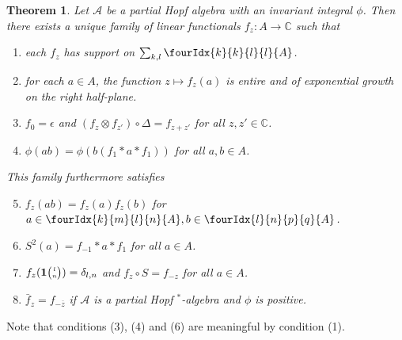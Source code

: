 \documentclass[10pt]{article}
\newcommand{\C}{\mathbb{C}}
\newcommand{\Grt}[3]{#1{\tiny {\begin{pmatrix} #2\\#3\end{pmatrix}}}}
\newcommand{\UnitC}[2]{\Grt{\mathbf{1}}{#1}{#2}}
\newcommand{\Gr}[5]{\fourIdx{#2}{#4}{#3}{#5}{#1}}%
\newtheorem{Theorem}{Theorem}[section]
\theoremstyle{definition}
\numberwithin{equation}{section}
\begin{document}
\begin{Theorem} \label{thm:rep-characters} Let $\mathscr{A}$ be a
  partial Hopf algebra with an invariant integral $\phi$.  Then there
  exists a unique family of linear functionals $f_{z} \colon A\to \C$
  such that
\begin{enumerate}[label={(\arabic*)}]
  \item each $f_z$ has support on $\sum_{k,l}\Gr{A}{k}{l}{k}{l}$.
  \item for each $a\in A$, the function $z\mapsto f_{z}(a)$ is entire
    and of exponential growth on the right half-plane.
  \item $f_{0} = \epsilon$ and $(f_{z} \otimes f_{z'}) \circ 
    \Delta= f_{z+z'}$ for all $z,z' \in \C$.
  \item $\phi(ab)=\phi(b(f_{1} \ast a \ast f_{1}))$ for all $a,b\in A$.
  \end{enumerate}
  This family furthermore satisfies
  \begin{enumerate}[label={(\arabic*)}]\setcounter{enumi}{4}
  \item $f_z(ab) = f_z(a)f_z(b)$ for $a\in \Gr{A}{k}{l}{m}{n},b\in \Gr{A}{l}{p}{n}{q}$. 
  \item $S^{2}(a)=f_{-1} \ast a \ast f_{1}$ for all $a\in A$.
  \item $f_{z}(\UnitC{l}{n})=\delta_{l,n}$ and $f_{z} \circ S = f_{-z}$ for all $a\in A$.
  \item $\bar{f}_{z}=f_{-\overline{z}}$ if $\mathscr{A}$ is a partial
    Hopf $^*$-algebra and $\phi$ is positive.
\end{enumerate}
\end{Theorem}


Note that conditions (3), (4) and (6) are meaningful by condition (1).
\end{document}
